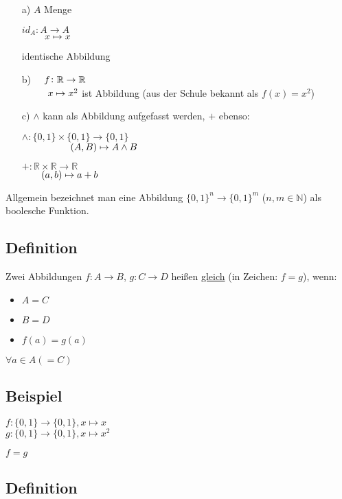 \documentclass[a4paper, 12pt, twoside] {article}
\begin{document}
\begin{itemize}
\item[a)] $A$ Menge

	$id_A \colon A \rightarrow A$ \\
	$\text{\qquad\space} x \mapsto x$
	
	identische Abbildung
	
\item[b)] 
		$\text{\quad} f \colon \mathbb{R} \rightarrow \mathbb{R}$ \\
		$\text{\space\qquad\space} x \mapsto x^2$ ist Abbildung (aus der Schule bekannt als $f(x)=x^2$)
		
\item[c)] $\land$ kann als Abbildung aufgefasst werden, $+$ ebenso:

$\land \colon \{0,1\} \times \{0,1\} \rightarrow \{0,1\}$ \\
$\text{\qquad\qquad\quad} (A,B) \mapsto A \land B$

$+ \colon \mathbb{R} \times \mathbb{R} \rightarrow \mathbb{R}$ \\
$\text{\qquad}(a,b) \mapsto a+b$
\end{itemize}

Allgemein bezeichnet man eine Abbildung $\{0,1\}^n \rightarrow \{0,1\}^m$ ($n,m \in \mathbb{N}$) als boolesche Funktion.

\subsection{Definition}

Zwei Abbildungen $f \colon A \rightarrow B$, $g \colon C \rightarrow D$ heißen \underline{gleich} (in Zeichen: $f=g$), wenn:
\begin{itemize}
\item $A=C$
\item $B=D$
\item $f(a)=g(a)$
\end{itemize}
$\forall a \in A (=C)$

\subsection{Beispiel}

$f \colon \{0,1\} \rightarrow \{0,1\}, x \mapsto x$ \\
$g \colon \{0,1\} \rightarrow \{0,1\}, x \mapsto x^2$

$f=g$

\subsection{Definition}
\end{document}
